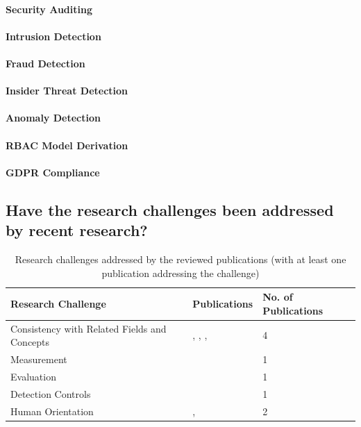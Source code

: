 \documentclass[runningheads]{llncs}
\begin{document}
\paragraph{Security Auditing}
\paragraph{Intrusion Detection}
\paragraph{Fraud Detection}
\paragraph{Insider Threat Detection}
\paragraph{Anomaly Detection}
\paragraph{RBAC Model Derivation}
\paragraph{GDPR Compliance}
\subsection{Have the research challenges been addressed by recent research?}\label{Q2}
\begin{table}
    \centering
    \caption{Research challenges addressed by the reviewed publications (with at least one publication addressing the challenge)}
    \label{challenges_table}
    \begin{tabular}{ | l | l | l | }
        \hline
        \textbf{Research Challenge} & \textbf{Publications}                                                                                                                                                            & \textbf{No. of Publications} \\
        \hline
        \hline
        Consistency with Related Fields and Concepts & \cite{Zaman20192982}, \cite{Accorsi20131462}, \cite{Zahoransky2014360}, \cite{Dedousis202235} & 4                            \\
        \hline
        Measurement & \cite{Dedousis202235} & 1 \\
        \hline
        Evaluation & \cite{Zahoransky2014360} & 1 \\

        \hline
        Detection Controls & \cite{Mishra2018613} & 1 \\
        \hline
        Human Orientation & \cite{Mardani2013}, \cite{Zhu201783} & 2 \\
        \hline
    \end{tabular}
\end{table}
\end{document}
